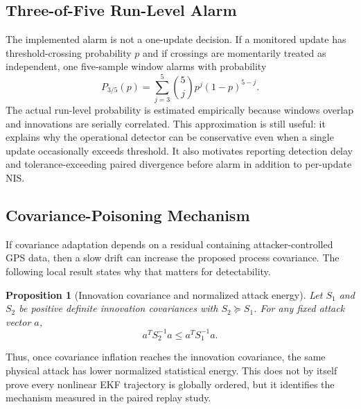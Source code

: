 \documentclass[conference]{IEEEtran}
\newtheorem{proposition}{Proposition}
\begin{document}
\subsection{Three-of-Five Run-Level Alarm}

The implemented alarm is not a one-update decision. If a monitored update has
threshold-crossing probability $p$ and if crossings are momentarily treated as
independent, one five-sample window alarms with probability
\begin{equation}
    P_{3/5}(p)=
    \sum_{j=3}^{5}\binom{5}{j}p^j(1-p)^{5-j}.
\end{equation}
The actual run-level probability is estimated empirically because windows
overlap and innovations are serially correlated. This approximation is still
useful: it explains why the operational detector can be conservative even
when a single update occasionally exceeds threshold. It also motivates
reporting detection delay and tolerance-exceeding paired divergence before
alarm in addition to per-update NIS.

\subsection{Covariance-Poisoning Mechanism}

If covariance adaptation depends on a residual containing attacker-controlled
GPS data, then a slow drift can increase the proposed process covariance. The
following local result states why that matters for detectability.

\begin{proposition}[Innovation covariance and normalized attack energy]
\label{prop:covariance_order}
Let $S_1$ and $S_2$ be positive definite innovation covariances with
$S_2 \succeq S_1$. For any fixed attack vector $a$,
\begin{equation}
    a^T S_2^{-1} a \leq a^T S_1^{-1} a.
\end{equation}
\end{proposition}

Thus, once covariance inflation reaches the innovation covariance, the same
physical attack has lower normalized statistical energy. This does not by
itself prove every nonlinear EKF trajectory is globally ordered, but it
identifies the mechanism measured in the paired replay study.
\end{document}
